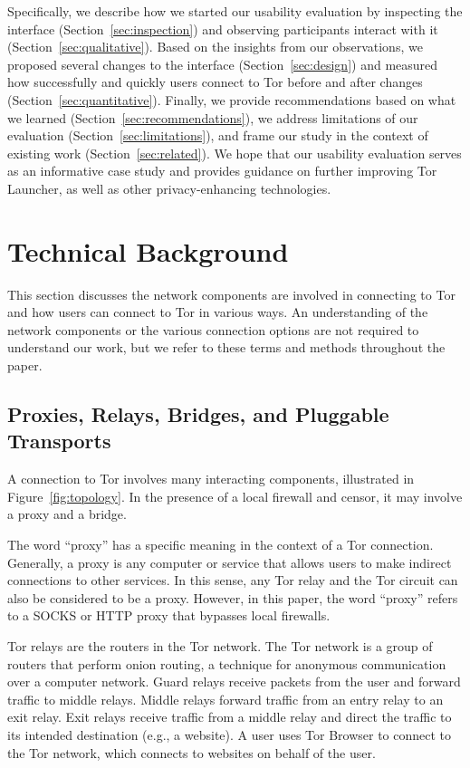\documentclass[USenglish,oneside,twocolumn]{article}
\begin{document}
Specifically, we describe how we started our usability evaluation by inspecting the interface (Section~\ref{sec:inspection}) and observing participants interact with it (Section~\ref{sec:qualitative}). Based on the insights from our observations, we proposed several changes to the interface (Section~\ref{sec:design}) and measured how successfully and quickly users connect to Tor before and after changes (Section~\ref{sec:quantitative}). Finally, we provide recommendations based on what we learned (Section~\ref{sec:recommendations}), we address limitations of our evaluation (Section~\ref{sec:limitations}), and frame our study in the context of existing work (Section~\ref{sec:related}). We hope that our usability evaluation serves as an informative case study and provides guidance on further improving Tor Launcher, as well as other privacy-enhancing technologies. 

\section{Technical Background}
\label{sec:background}
This section discusses the network components are involved in connecting to Tor and how users can connect to Tor in various ways. An understanding of the network components or the various connection options are not required to understand our work, but we refer to these terms and methods throughout the paper.  

\subsection{Proxies, Relays, Bridges, and Pluggable Transports} 

A connection to Tor involves many interacting components,
illustrated in Figure~\ref{fig:topology}.
In the presence of a local firewall and censor, it may involve a proxy and a bridge.

The word ``proxy'' has a specific meaning in the context of a Tor connection.
Generally, a proxy is any computer or service that allows users to make indirect connections to other services. In this sense, any Tor relay and the Tor circuit can also be considered to be a proxy. However, in this paper, the word ``proxy'' refers to a SOCKS or HTTP proxy that bypasses local firewalls.

Tor relays are the routers in the Tor network. The Tor network is a group of routers that perform onion routing, a technique for anonymous communication over a computer network.  Guard relays receive packets from the user and forward traffic to middle relays. Middle relays forward traffic from an entry relay to an exit relay. Exit relays receive traffic from a middle relay and direct the traffic to its intended destination (e.g., a website).  A user uses Tor Browser to connect to the Tor network, which connects to websites on behalf of the user. 
\end{document}
